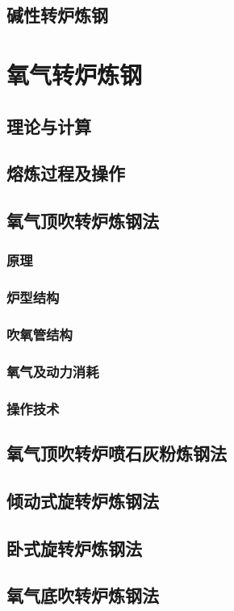 \documentclass[UTF8]{../../ApplicationUniverse}
\begin{document}
    \subsection{碱性转炉炼钢}
\section{氧气转炉炼钢}
    \subsection{理论与计算}
    \subsection{熔炼过程及操作}
    \subsection{氧气顶吹转炉炼钢法}
        \subsubsection{原理}
        \subsubsection{炉型结构}
        \subsubsection{吹氧管结构}
        \subsubsection{氧气及动力消耗}
        \subsubsection{操作技术}
    \subsection{氧气顶吹转炉喷石灰粉炼钢法}
    \subsection{倾动式旋转炉炼钢法}
    \subsection{卧式旋转炉炼钢法}
    \subsection{氧气底吹转炉炼钢法}
\end{document}
